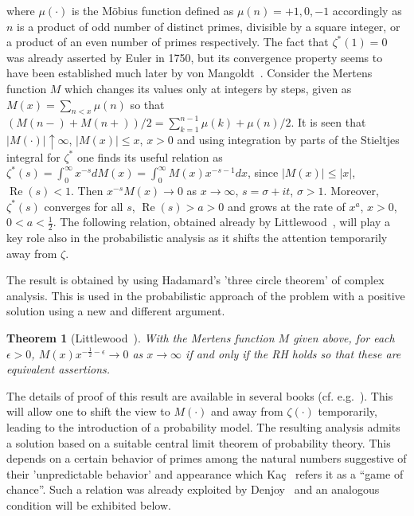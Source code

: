 \documentclass[11pt]{article}
\newtheorem{theorem}{Theorem}
\begin{document}
where $\mu(\cdot)$ is the Möbius function defined as $\mu(n) = +1, 0, -1$ accordingly as $n$ is a product of odd number of distinct primes, divisible by a square integer, or a product of an even number of primes respectively. The fact that $\zeta^*(1) = 0$ was already asserted by Euler in 1750, but its convergence property seems to have been established much later by von Mangoldt~\cite{mangoldt}. Consider the Mertens function $M$ which changes its values only at integers by steps, given as $M(x) = \sum_{n<x} \mu(n)$ so that $(M(n-) + M(n+))/2 = \sum_{k=1}^{n-1} \mu(k) + \mu(n)/2$. It is seen that $|M(\cdot)| \uparrow \infty$, $|M(x)| \leq x$, $x > 0$ and using integration by parts of the Stieltjes integral for $\zeta^*$ one finds its useful relation as $\zeta^*(s) = \int_0^\infty x^{-s} dM(x) = \int_0^\infty M(x) x^{-s-1} dx$, since $|M(x)| \leq |x|$, $\operatorname{Re}(s) < 1$. Then $x^{-s} M(x) \to 0$ as $x \to \infty$, $s = \sigma + it$, $\sigma > 1$. Moreover, $\zeta^*(s)$ converges for all $s$, $\operatorname{Re}(s) > a > 0$ and grows at the rate of $x^a$, $x > 0$, $0 < a < \frac{1}{2}$. The following relation, obtained already by Littlewood~\cite{littlewood1912}, will play a key role also in the probabilistic analysis as it shifts the attention temporarily away from $\zeta$.

The result is obtained by using Hadamard's 'three circle theorem' of complex analysis. This is used in the probabilistic approach of the problem with a positive solution using a new and different argument.

\begin{theorem}[Littlewood~\cite{littlewood1912}]
\label{thm:littlewood}
With the Mertens function $M$ given above, for each $\epsilon > 0$, $M(x) x^{-\frac{1}{2} - \epsilon} \to 0$ as $x \to \infty$ if and only if the RH holds so that these are equivalent assertions.
\end{theorem}

The details of proof of this result are available in several books (cf. e.g.~\cite{edwards}). This will allow one to shift the view to $M(\cdot)$ and away from $\zeta(\cdot)$ temporarily, leading to the introduction of a probability model. The resulting analysis admits a solution based on a suitable central limit theorem of probability theory. This depends on a certain behavior of primes among the natural numbers suggestive of their 'unpredictable behavior' and appearance which Kaç~\cite{kac} refers it as a ``game of chance''. Such a relation was already exploited by Denjoy~\cite{denjoy} and an analogous condition will be exhibited below.
\end{document}
